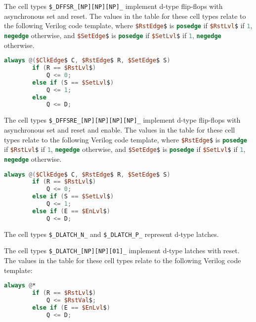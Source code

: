 The cell types {\tt \$\_DFFSR\_[NP][NP][NP]\_} implement
d-type flip-flops with asynchronous set and reset. The values in the table for these cell types relate to the
following Verilog code template, where \lstinline[mathescape,language=Verilog];$RstEdge$; is \lstinline[language=Verilog];posedge;
if \lstinline[mathescape,language=Verilog];$RstLvl$; if \lstinline[language=Verilog];1;, \lstinline[language=Verilog];negedge;
otherwise, and \lstinline[mathescape,language=Verilog];$SetEdge$; is \lstinline[language=Verilog];posedge;
if \lstinline[mathescape,language=Verilog];$SetLvl$; if \lstinline[language=Verilog];1;, \lstinline[language=Verilog];negedge;
otherwise.

\begin{lstlisting}[mathescape,language=Verilog]
	always @($ClkEdge$ C, $RstEdge$ R, $SetEdge$ S)
		if (R == $RstLvl$)
			Q <= 0;
		else if (S == $SetLvl$)
			Q <= 1;
		else
			Q <= D;
\end{lstlisting}

The cell types {\tt \$\_DFFSRE\_[NP][NP][NP][NP]\_} implement
d-type flip-flops with asynchronous set and reset and enable. The values in the table for these cell types relate to the
following Verilog code template, where \lstinline[mathescape,language=Verilog];$RstEdge$; is \lstinline[language=Verilog];posedge;
if \lstinline[mathescape,language=Verilog];$RstLvl$; if \lstinline[language=Verilog];1;, \lstinline[language=Verilog];negedge;
otherwise, and \lstinline[mathescape,language=Verilog];$SetEdge$; is \lstinline[language=Verilog];posedge;
if \lstinline[mathescape,language=Verilog];$SetLvl$; if \lstinline[language=Verilog];1;, \lstinline[language=Verilog];negedge;
otherwise.

\begin{lstlisting}[mathescape,language=Verilog]
	always @($ClkEdge$ C, $RstEdge$ R, $SetEdge$ S)
		if (R == $RstLvl$)
			Q <= 0;
		else if (S == $SetLvl$)
			Q <= 1;
		else if (E == $EnLvl$)
			Q <= D;
\end{lstlisting}

The cell types {\tt \$\_DLATCH\_N\_} and {\tt \$\_DLATCH\_P\_} represent d-type latches.

The cell types {\tt \$\_DLATCH\_[NP][NP][01]\_} implement
d-type latches with reset. The values in the table for these cell types relate to the
following Verilog code template:

\begin{lstlisting}[mathescape,language=Verilog]
	always @*
		if (R == $RstLvl$)
			Q <= $RstVal$;
		else if (E == $EnLvl$)
			Q <= D;
\end{lstlisting}

